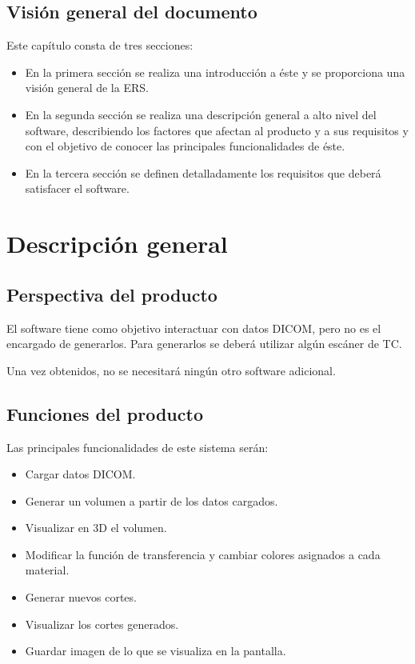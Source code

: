 	\subsection{Visión general del documento}
	
	Este capítulo consta de tres secciones:
	\begin{itemize}
		\item En la primera sección se realiza una introducción a éste y se proporciona una visión general de la ERS.
		\item En la segunda sección se realiza una descripción general a alto nivel del software, describiendo los factores que afectan al producto y a sus requisitos y con el objetivo de conocer las principales funcionalidades de éste.
		\item En la tercera sección se definen detalladamente los requisitos que deberá satisfacer el software.
	\end{itemize}

\section{Descripción general}

\subsection{Perspectiva del producto}

	El software \myTitle tiene como objetivo interactuar con datos DICOM, pero no es el encargado de generarlos. Para generarlos se deberá utilizar algún escáner de TC.
	
	Una vez obtenidos, no se necesitará ningún otro software adicional.
	
	\subsection{Funciones del producto}
	
	Las principales funcionalidades de este sistema serán:
	\begin{itemize}
		\item Cargar datos DICOM.
		\item Generar un volumen a partir de los datos cargados.
		\item Visualizar en 3D el volumen.
		\item Modificar la función de transferencia y cambiar colores asignados a cada material.
		\item Generar nuevos cortes.
		\item Visualizar los cortes generados.
		\item Guardar imagen de lo que se visualiza en la pantalla.
	\end{itemize}
	
